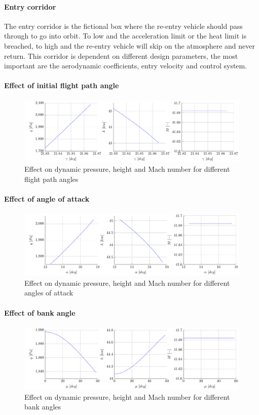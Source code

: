 \paragraph{Entry corridor}

The entry corridor is the fictional box where the re-entry vehicle should pass through to go into orbit. To low and the acceleration limit or the heat limit is breached, to high and the re-entry vehicle will skip on the atmosphere and never return. This corridor is dependent on different design parameters, the most important are the aerodynamic coefficients, entry velocity and control system.

\paragraph{Effect of initial flight path angle}

\begin{figure}[H]
	\centering
	\includegraphics[width=\textwidth]{./Figure/orbit/effectgamma.pdf}
	\caption{Effect on dynamic pressure, height and Mach number for different flight path angles}
	\label{fig:effectgamma}
\end{figure}

\paragraph{Effect of angle of attack}

\begin{figure}[H]
	\centering
	\includegraphics[width=\textwidth]{./Figure/orbit/effectalpha.pdf}
	\caption{Effect on dynamic pressure, height and Mach number for different angles of attack}
	\label{fig:effectalpha}
\end{figure}

\paragraph{Effect of bank angle}

\begin{figure}[H]
	\centering
	\includegraphics[width=\textwidth]{./Figure/orbit/effectmu.pdf}
	\caption{Effect on dynamic pressure, height and Mach number for different bank angles}
	\label{fig:effectmu}
\end{figure}


